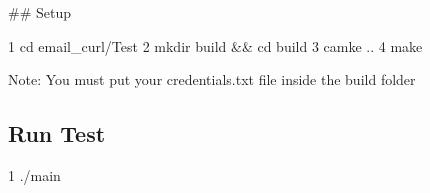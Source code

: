 \#\# Setup 
\begin{DoxyCode}
1 cd email\_curl/Test
2 mkdir build && cd build
3 camke ..
4 make
\end{DoxyCode}
 Note\+: You must put your credentials.\+txt file inside the build folder

\subsection*{Run Test}


\begin{DoxyCode}
1 ./main
\end{DoxyCode}
 